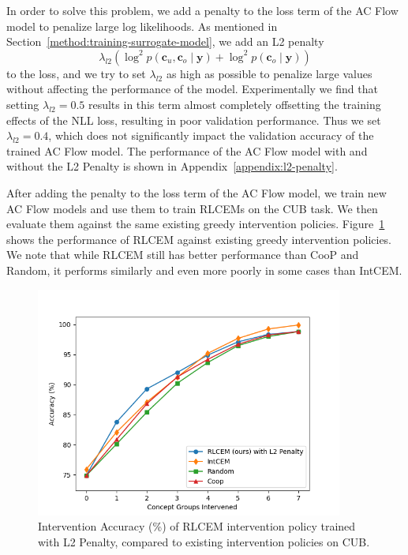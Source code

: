 
In order to solve this problem, we add a penalty 
to the loss term of the AC Flow model to penalize
large log likelihoods. As mentioned in Section~\ref{method:training-surrogate-model},
we add an L2 penalty
\[\lambda_{l2} \left ( \log^2 p(\mathbf{c}_u, \mathbf{c}_o \mid \mathbf{y}) + 
\log^2 p(\mathbf{c}_o \mid \mathbf{y}) \right )\]
to the loss, and we try to set $\lambda_{l2}$ 
as high as possible to penalize large values without affecting the performance of the model.
Experimentally we find that setting $\lambda_{l2} = 0.5$ results 
in this term almost completely offsetting the training 
effects of the NLL loss, resulting in 
poor validation performance. Thus we set $\lambda_{l2} = 0.4$,
which does not significantly impact the validation accuracy of the trained AC Flow model.
The performance of the AC Flow model with and without the L2 Penalty is shown 
in Appendix~\ref{appendix:l2-penalty}.

After adding the penalty to the loss term of the AC Flow model, we train new AC Flow models 
and use them to train RLCEMs on the CUB task. We then evaluate them against 
the same existing greedy intervention policies. Figure~\ref{fig:cub-rlcem_performance-l2}
shows the performance of RLCEM against existing greedy intervention policies.
We note that while RLCEM still has better performance than CooP and Random,
it performs similarly and even more poorly in some cases than IntCEM.


\begin{figure}[!h]
    \centering
    \includegraphics[width=0.9\textwidth]{figs/evaluation/cub_rlcem_performance_l2.png}
    \caption{
        Intervention Accuracy (\%) of RLCEM intervention
        policy trained with L2 Penalty, compared to existing intervention policies on CUB.
    }
    \label{fig:cub-rlcem_performance-l2}
\end{figure}

